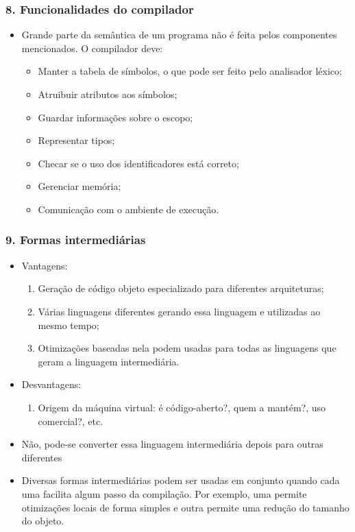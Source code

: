 \documentclass{beamer}
\begin{document}
\begin{frame}
  \frametitle{8. Funcionalidades do compilador}
  \begin{itemize}
  \item Grande parte da sem\^antica de um programa n\~ao \'e feita
    pelos componentes mencionados. O compilador deve:
    \begin{itemize}
    \item Manter a tabela de s\'imbolos, o que pode ser feito pelo
      analisador l\'exico;
    \item Atruibuir atributos aos s\'imbolos;
    \item Guardar informa\c c\~oes sobre o escopo;
    \item Representar tipos;
    \item Checar se o uso dos identificadores est\'a correto;
    \item Gerenciar mem\'oria;
    \item Comunica\c c\~ao com o ambiente de execu\c c\~ao.
    \end{itemize}
  \end{itemize}
\end{frame}

\begin{frame}
  \frametitle{9. Formas intermedi\'arias}
  \begin{itemize}
  \item Vantagens:
    \begin{enumerate}
    \item Gera\c c\~ao de c\'odigo objeto especializado para
      diferentes arquiteturas;
    \item V\'arias linguagens diferentes gerando essa linguagem e
      utilizadas ao mesmo tempo;
    \item Otimiza\c c\~oes baseadas nela podem usadas para todas as
      linguagens que geram a linguagem intermedi\'aria.
    \end{enumerate}
  \item Desvantagens:
    \begin{enumerate}
    \item Origem da m\'aquina virtual: \'e c\'odigo-aberto?, quem a
      mant\'em?, uso comercial?, etc.
    \end{enumerate}
  \item N\~ao, pode-se converter essa linguagem intermedi\'aria depois
    para outras diferentes
  \item Diversas formas intermedi\'arias podem ser usadas em conjunto
    quando cada uma facilita algum passo da compila\c c\~ao. Por
    exemplo, uma permite otimiza\c c\~oes locais de forma simples e
    outra permite uma redu\c c\~ao do tamanho do objeto.
  \end{itemize}
\end{frame}
\end{document}
